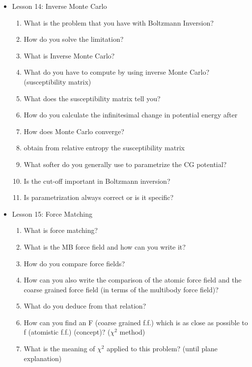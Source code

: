 {\begin{itemize}
\begin{enumerate}
        \item What is the solution? (explain with formulae)
        \item What is another problem with the iterative Boltzmann inversion process? What kind of properties do not converge for example?    
    \end{enumerate}
    \item Lesson 14: Inverse Monte Carlo
    \begin{enumerate}
        \item What is the problem that you have with Boltzmann Inversion?
        \item How do you solve the limitation?
        \item What is Inverse Monte Carlo?
        \item What do you have to compute by using inverse Monte Carlo? (susceptibility matrix)
        \item What does the susceptibility matrix tell you?
        \item How do you calculate the infinitesimal change in potential energy after
        \item How does Monte Carlo converge?
        \item obtain from relative entropy the susceptibility matrix
        \item What softer do you generally use to parametrize the CG  potential?
        \item Is the cut-off important in Boltzmann inversion?
        \item Is parametrization always correct or is it specific?
    \end{enumerate}
    \item Lesson 15: Force Matching
    \begin{enumerate}
        \item What is force matching?
        \item What is the MB force field and how can you write it?
        \item How do you compare force fields?
        \item How can you also write the comparison of the atomic force field and the coarse grained force field (in terms of the multibody force field)?
        \item What do you deduce from that relation?
        \item How can you find an F (coarse grained f.f.) which is as close as possible to f (atomistic f.f.) (concept)? ($\chi^2$ method) 
        \item What is the meaning of $\chi^2$ applied to this problem? (until plane explanation)

\end{enumerate}
\end{itemize}}
